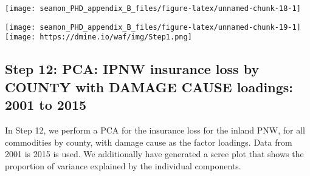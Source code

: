 \documentclass[]{article}
\newenvironment{Shaded}{\begin{snugshade}}{\end{snugshade}}
\newcommand{\CommentTok}[1]{\textcolor[rgb]{0.56,0.35,0.01}{\textit{#1}}}
\newcommand{\DataTypeTok}[1]{\textcolor[rgb]{0.13,0.29,0.53}{#1}}
\newcommand{\DecValTok}[1]{\textcolor[rgb]{0.00,0.00,0.81}{#1}}
\newcommand{\KeywordTok}[1]{\textcolor[rgb]{0.13,0.29,0.53}{\textbf{#1}}}
\newcommand{\NormalTok}[1]{#1}
\newcommand{\OperatorTok}[1]{\textcolor[rgb]{0.81,0.36,0.00}{\textbf{#1}}}
\newcommand{\StringTok}[1]{\textcolor[rgb]{0.31,0.60,0.02}{#1}}
\begin{document}
\texttt{[image: seamon\_PHD\_appendix\_B\_files/figure-latex/unnamed-chunk-18-1]}

\begin{Shaded}
\end{Shaded}

\texttt{[image: seamon\_PHD\_appendix\_B\_files/figure-latex/unnamed-chunk-19-1]}
\texttt{[image: https://dmine.io/waf/img/Step1.png]}

\hypertarget{step-12-pca-ipnw-insurance-loss-by-county-with-damage-cause-loadings-2001-to-2015}{%
\subsection{Step 12: PCA: IPNW insurance loss by COUNTY with DAMAGE
CAUSE loadings: 2001 to
2015}\label{step-12-pca-ipnw-insurance-loss-by-county-with-damage-cause-loadings-2001-to-2015}}

In Step 12, we perform a PCA for the insurance loss for the inland PNW,
for all commodities by county, with damage cause as the factor loadings.
Data from 2001 is 2015 is used. We additionally have generated a scree
plot that shows the proportion of variance explained by the individual
components.
\end{document}
